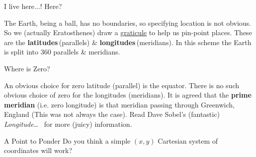 \begin{myFrame}{I live here...! Here?}{}
\medskip
{}
%
\bigskip
\setCol
\begin{itemize}
\col The Earth, being a ball, has no boundaries, so specifying location is not obvious.
\col So we (actually Eratosthenes) draw a \href{http://en.wikipedia.org/wiki/Reticle}{graticule} to help us pin-point places.
\col These are the \textbf{latitudes}\,(parallels) \& \textbf{longitudes}\,(meridians).
\col In this scheme the Earth is split into 360 parallels \& meridians.
\end{itemize}
%
\end{myFrame}

\begin{myFrame}{Where is Zero?}{}
\medskip



\setCol
\small
\begin{itemize}
\col An obvious choice for zero latitude (parallel) is the equator.
\col There is no such obvious choice of zero for the longitudes (meridians).
\col It is agreed that the \textbf{prime meridian} (i.e. zero longitude) is that meridian passing through Greenwich, England (This was not always the case). 
\col Read Dave Sobel's (fantastic) \emph{Longitude\ldots}~\cite{Sobel1995} for more (juicy) information.
\end{itemize}
\begin{myBlock}[0.55\linewidth]{\centering A Point to Ponder}\centering
Do you think a simple $(x,y)$ Cartesian system of coordinates will  work?
\end{myBlock}
\end{myFrame}

